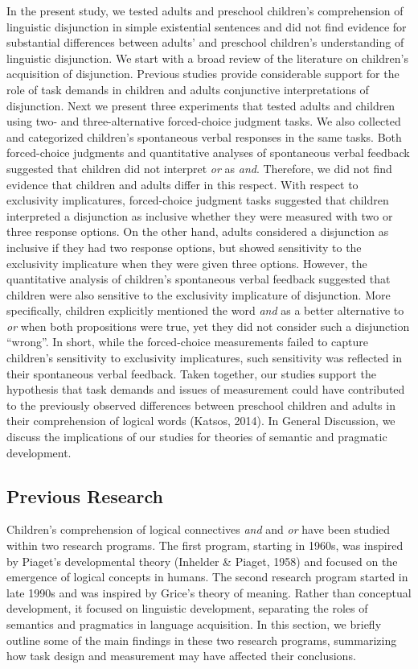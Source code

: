 \documentclass[,man,floatsintext]{apa6}
\begin{document}
In the present study, we tested adults and preschool children's comprehension of linguistic disjunction in simple existential sentences and did not find evidence for substantial differences between adults' and preschool children's understanding of linguistic disjunction. We start with a broad review of the literature on children's acquisition of disjunction. Previous studies provide considerable support for the role of task demands in children and adults conjunctive interpretations of disjunction. Next we present three experiments that tested adults and children using two- and three-alternative forced-choice judgment tasks. We also collected and categorized children's spontaneous verbal responses in the same tasks. Both forced-choice judgments and quantitative analyses of spontaneous verbal feedback suggested that children did not interpret \emph{or} as \emph{and}. Therefore, we did not find evidence that children and adults differ in this respect. With respect to exclusivity implicatures, forced-choice judgment tasks suggested that children interpreted a disjunction as inclusive whether they were measured with two or three response options. On the other hand, adults considered a disjunction as inclusive if they had two response options, but showed sensitivity to the exclusivity implicature when they were given three options. However, the quantitative analysis of children's spontaneous verbal feedback suggested that children were also sensitive to the exclusivity implicature of disjunction. More specifically, children explicitly mentioned the word \emph{and} as a better alternative to \emph{or} when both propositions were true, yet they did not consider such a disjunction \enquote{wrong}. In short, while the forced-choice measurements failed to capture children's sensitivity to exclusivity implicatures, such sensitivity was reflected in their spontaneous verbal feedback. Taken together, our studies support the hypothesis that task demands and issues of measurement could have contributed to the previously observed differences between preschool children and adults in their comprehension of logical words (Katsos, 2014). In General Discussion, we discuss the implications of our studies for theories of semantic and pragmatic development.

\hypertarget{litreview}{%
\subsection{Previous Research}\label{litreview}}

Children's comprehension of logical connectives \emph{and} and \emph{or} have been studied within two research programs. The first program, starting in 1960s, was inspired by Piaget's developmental theory (Inhelder \& Piaget, 1958) and focused on the emergence of logical concepts in humans. The second research program started in late 1990s and was inspired by Grice's theory of meaning. Rather than conceptual development, it focused on linguistic development, separating the roles of semantics and pragmatics in language acquisition. In this section, we briefly outline some of the main findings in these two research programs, summarizing how task design and measurement may have affected their conclusions.
\end{document}
